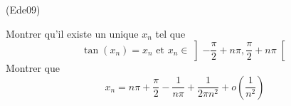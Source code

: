 \begin{tiny}(Ede09)\end{tiny} Montrer qu'il existe un unique $x_n$ tel que
\begin{displaymath}
 \tan(x_n) = x_n \text{ et } x_n\in \left] -\frac{\pi}{2}+n\pi,\frac{\pi}{2}+n\pi\right[ 
\end{displaymath}
 Montrer que
\begin{displaymath}
 x_n = n\pi + \frac{\pi}{2} -\frac{1}{n\pi}+\frac{1}{2\pi n^2} + o(\frac{1}{n^2})
\end{displaymath}
